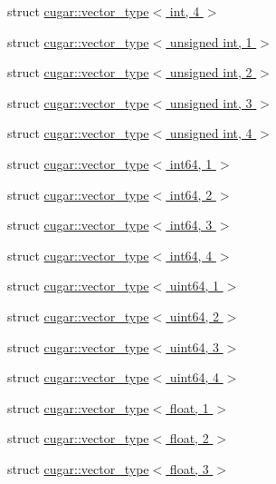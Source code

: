 \begin{DoxyCompactItemize}
\item 
struct \hyperlink{structcugar_1_1vector__type_3_01int_00_014_01_4}{cugar\+::vector\+\_\+type$<$ int, 4 $>$}
\item 
struct \hyperlink{structcugar_1_1vector__type_3_01unsigned_01int_00_011_01_4}{cugar\+::vector\+\_\+type$<$ unsigned int, 1 $>$}
\item 
struct \hyperlink{structcugar_1_1vector__type_3_01unsigned_01int_00_012_01_4}{cugar\+::vector\+\_\+type$<$ unsigned int, 2 $>$}
\item 
struct \hyperlink{structcugar_1_1vector__type_3_01unsigned_01int_00_013_01_4}{cugar\+::vector\+\_\+type$<$ unsigned int, 3 $>$}
\item 
struct \hyperlink{structcugar_1_1vector__type_3_01unsigned_01int_00_014_01_4}{cugar\+::vector\+\_\+type$<$ unsigned int, 4 $>$}
\item 
struct \hyperlink{structcugar_1_1vector__type_3_01int64_00_011_01_4}{cugar\+::vector\+\_\+type$<$ int64, 1 $>$}
\item 
struct \hyperlink{structcugar_1_1vector__type_3_01int64_00_012_01_4}{cugar\+::vector\+\_\+type$<$ int64, 2 $>$}
\item 
struct \hyperlink{structcugar_1_1vector__type_3_01int64_00_013_01_4}{cugar\+::vector\+\_\+type$<$ int64, 3 $>$}
\item 
struct \hyperlink{structcugar_1_1vector__type_3_01int64_00_014_01_4}{cugar\+::vector\+\_\+type$<$ int64, 4 $>$}
\item 
struct \hyperlink{structcugar_1_1vector__type_3_01uint64_00_011_01_4}{cugar\+::vector\+\_\+type$<$ uint64, 1 $>$}
\item 
struct \hyperlink{structcugar_1_1vector__type_3_01uint64_00_012_01_4}{cugar\+::vector\+\_\+type$<$ uint64, 2 $>$}
\item 
struct \hyperlink{structcugar_1_1vector__type_3_01uint64_00_013_01_4}{cugar\+::vector\+\_\+type$<$ uint64, 3 $>$}
\item 
struct \hyperlink{structcugar_1_1vector__type_3_01uint64_00_014_01_4}{cugar\+::vector\+\_\+type$<$ uint64, 4 $>$}
\item 
struct \hyperlink{structcugar_1_1vector__type_3_01float_00_011_01_4}{cugar\+::vector\+\_\+type$<$ float, 1 $>$}
\item 
struct \hyperlink{structcugar_1_1vector__type_3_01float_00_012_01_4}{cugar\+::vector\+\_\+type$<$ float, 2 $>$}
\item 
struct \hyperlink{structcugar_1_1vector__type_3_01float_00_013_01_4}{cugar\+::vector\+\_\+type$<$ float, 3 $>$}

\end{DoxyCompactItemize}
